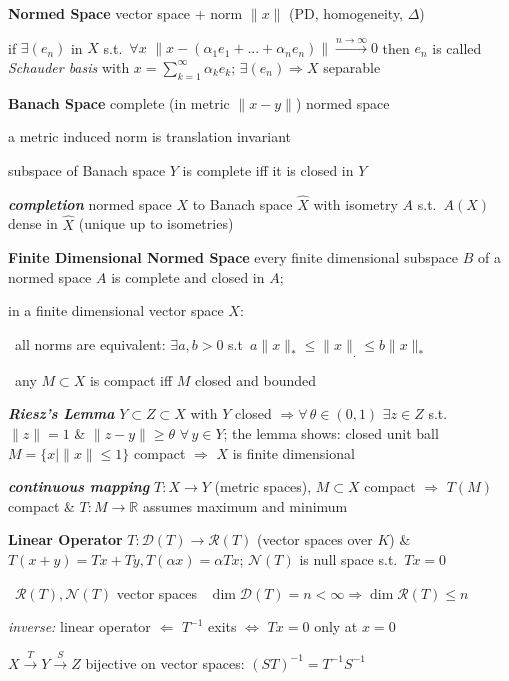 \documentclass[8pt,twoside]{extarticle}
\begin{document}
\begin{multicols}{2}
\textbf{Normed Space} vector space + norm $\|x\|$ (PD, homogeneity, $\Delta$)

if $\exists (e_n)$ in $X$ s.t.\ $\forall x \,\, \|x-(\alpha_1e_1+...+\alpha_ne_n)\|\overset{n\to\infty}{\to} 0$ then $e_n$ is called \textit{Schauder basis} with $x{=}\sum_{k=1}^\infty\alpha_ke_k$; $\exists (e_n)\Rightarrow X$ separable


\textbf{Banach Space} complete (in metric $\|x-y\|$) normed space

a metric induced norm is translation invariant

subspace of Banach space $Y$ is complete iff it is closed in $Y$

\textit{\textbf{completion}} normed space $X$ to Banach space $\hat{X}$ with isometry $A$ s.t.\ $A(X)$  dense in $\hat{X}$ (unique up to isometries)

\textbf{Finite Dimensional Normed Space} every finite dimensional subspace $B$ of a normed space $A$ is complete and closed in $A$;

in a finite dimensional vector space $X$:

\textbullet \ all norms are equivalent: $\exists a,b>0$ s.t\ $a\|x\|_*\leq \|x\|_.\leq b \|x\|_*$ 

\textbullet \ any $M\subset X$ is compact iff $M$ closed and bounded 

\textbf{\textit{Riesz's Lemma}} $Y\subset Z \subset X$ with $Y$ closed $\Rightarrow \forall \,\theta{\in}(0,1)\,\, \exists z{\in} Z$ s.t.\ $\|z\|{=}1$ \& $\|z{-}y\|\geq \theta \,\,\forall\, y{\in} Y$; the lemma shows: closed unit ball $M=\{x|\|x\|\leq 1\}$ compact $\Rightarrow$ $X$ is finite dimensional

\textbf{\textit{continuous mapping}} $T{:}X{\to} Y$ (metric spaces), $M{\subset} X$ compact $\Rightarrow$ $T(M)$ compact \& $T{:}M{\to} \mathbb{R}$ assumes maximum and minimum

\textbf{Linear Operator}  $T:\mathscr{D}(T)\to \mathscr{R}(T)$ (vector spaces over $K$) \& $T(x{+}y)=Tx{+}Ty, T(\alpha x)=\alpha Tx$; $\mathscr{N}(T)$ is null space s.t.\ $Tx{=}0$

\textbullet \ $\mathscr{R}(T), \mathscr{N}(T)$ vector spaces \textbullet \ $\dim\mathscr{D}(T){=}n{<}\infty\Rightarrow \dim\mathscr{R}(T)\leq n$

\textit{inverse:} linear operator $\Leftarrow$ $T^{-1}$ exits  $\Leftrightarrow$ $Tx{=}0$ only at $x{=}0$

$X\overset{T}{\to}Y\overset{S}{\to}Z$ bijective on vector spaces: $(ST)^{-1}=T^{-1}S^{-1}$


\end{multicols}
\end{document}
